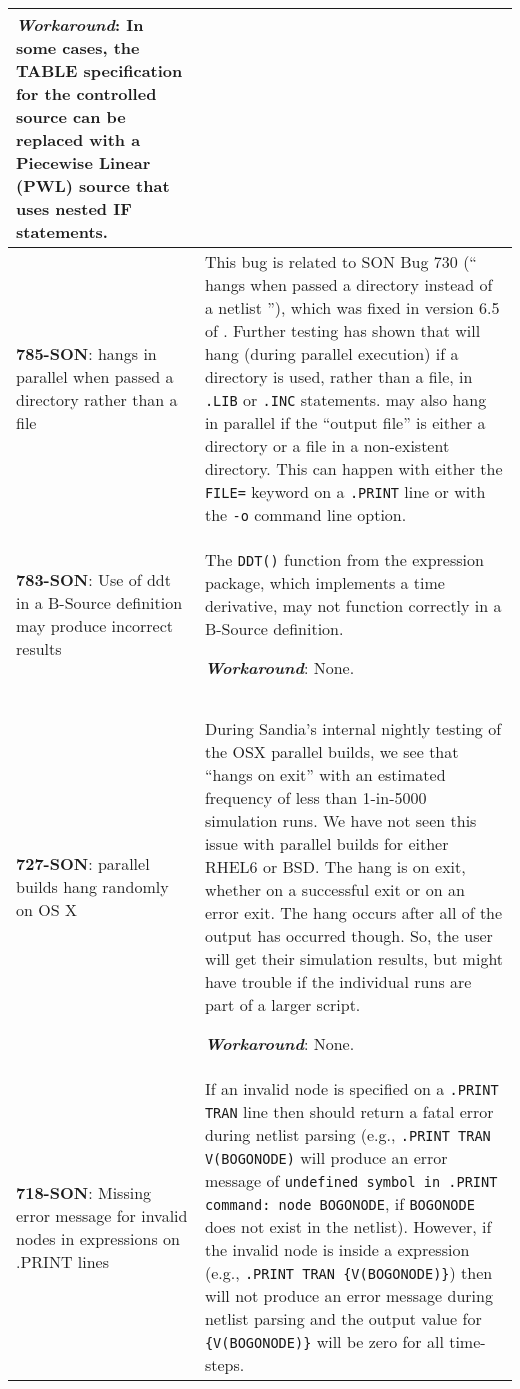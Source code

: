 {\begin{longtable}[h] {>{\raggedright\small}m{2in}|>{\raggedright\let\\\tabularnewline\small}m{3.5in}}
\textbf{\textit{Workaround}}: In some cases, the TABLE specification for the controlled
source can be replaced with a Piecewise Linear (PWL) source that uses nested IF 
statements. \\ \hline

\textbf{785-SON}: \Xyce{} hangs in parallel when passed a directory rather than a file &
This bug is related to SON Bug 730 (``\Xyce{} hangs when passed a directory instead of a 
netlist ''), which was fixed in version 6.5 of \Xyce{}.  Further testing has shown that \Xyce{}
will hang (during parallel execution) if a directory is used, rather than a file, in
\texttt{.LIB} or \texttt{.INC} statements.  \Xyce{} may also hang in parallel if
the ``output file'' is either a directory or a file in a non-existent directory.
This can happen with either the \texttt{FILE=} keyword on a \texttt{.PRINT} line or
with the \texttt{-o} command line option. \\ \hline

\textbf{783-SON}: Use of ddt in a B-Source definition may produce incorrect results  & The \texttt{DDT()} 
function from the \Xyce{} expression package, which implements a time derivative, may not function 
correctly in a B-Source definition.

\textbf{\textit{Workaround}}: None. \\ \hline

\textbf{727-SON}: \Xyce{} parallel builds hang randomly on OS X & During Sandia's internal 
nightly testing of the OSX parallel builds, we see that \Xyce{} ``hangs on exit'' with an 
estimated frequency of less than 1-in-5000 simulation runs.  We have not seen this issue 
with parallel builds for either RHEL6 or BSD.  The hang is on exit, whether on a successful 
exit or on an error exit.  The hang occurs after all of the \Xyce{} output has occurred though.  
So, the user will get their simulation results, but might have trouble if the individual \Xyce{} runs 
are part of a larger script.

\textbf{\textit{Workaround}}: None. \\ \hline

\textbf{718-SON}: Missing error message for invalid nodes in expressions on .PRINT lines & If an invalid node
is specified on a \Xyce{} \texttt{.PRINT TRAN} line then \Xyce{} should return a fatal error during netlist
parsing (e.g., \texttt{.PRINT TRAN V(BOGONODE)} will produce an error message of \texttt{undefined 
symbol in .PRINT command: node BOGONODE}, if \texttt{BOGONODE} does not exist in the netlist).  However, if the
invalid node is inside a \Xyce{} expression (e.g., \texttt{.PRINT TRAN \{V(BOGONODE)\}}) then \Xyce{} will 
not produce an error message during netlist parsing and the output value for \texttt{\{V(BOGONODE)\}} will 
be zero for all time-steps.


\end{longtable}}
